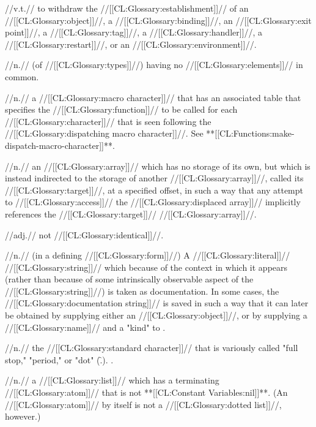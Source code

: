  //v.t.// to withdraw the //[[CL:Glossary:establishment]]// of an //[[CL:Glossary:object]]//, a //[[CL:Glossary:binding]]//, an //[[CL:Glossary:exit point]]//, a //[[CL:Glossary:tag]]//, a //[[CL:Glossary:handler]]//, a //[[CL:Glossary:restart]]//, or an //[[CL:Glossary:environment]]//.
 
 //n.// (of //[[CL:Glossary:types]]//) having no //[[CL:Glossary:elements]]// in common.

 //n.// a //[[CL:Glossary:macro character]]// that has an associated table that specifies the //[[CL:Glossary:function]]// to be called for each //[[CL:Glossary:character]]// that is seen following the //[[CL:Glossary:dispatching macro character]]//. See **[[CL:Functions:make-dispatch-macro-character]]**.

 //n.// an //[[CL:Glossary:array]]// which has no storage of its own, but which is instead indirected to the storage of another //[[CL:Glossary:array]]//, called its //[[CL:Glossary:target]]//, at a specified offset, in such a way that any attempt to //[[CL:Glossary:access]]// the //[[CL:Glossary:displaced array]]// implicitly references the //[[CL:Glossary:target]]// //[[CL:Glossary:array]]//.

 //adj.// not //[[CL:Glossary:identical]]//.

 //n.// (in a defining //[[CL:Glossary:form]]//) A //[[CL:Glossary:literal]]// //[[CL:Glossary:string]]// which because of the context in which it appears (rather than because of some intrinsically observable aspect of the //[[CL:Glossary:string]]//) is taken as documentation. In some cases, the //[[CL:Glossary:documentation string]]// is saved in such a way that it can later be obtained by supplying either an //[[CL:Glossary:object]]//, or by supplying a //[[CL:Glossary:name]]// and a "kind" to . 

 //n.// the //[[CL:Glossary:standard character]]// that is variously called "full stop," "period," or "dot" (\f{.}). \Seefigure\StdCharsThree.

 //n.// a //[[CL:Glossary:list]]// which has a terminating //[[CL:Glossary:atom]]// that is not **[[CL:Constant Variables:nil]]**. (An //[[CL:Glossary:atom]]// by itself is not a //[[CL:Glossary:dotted list]]//, however.)

